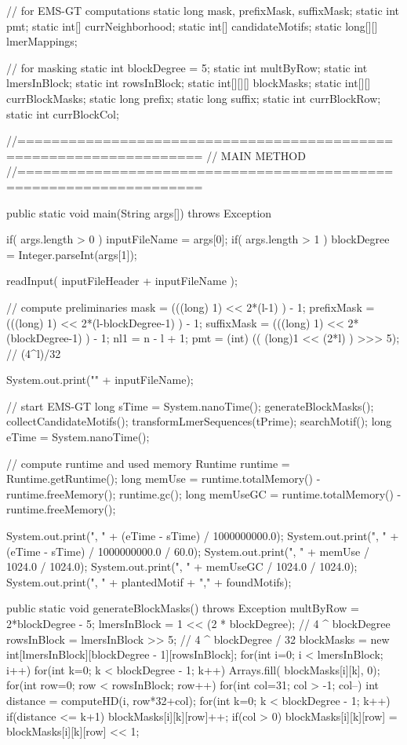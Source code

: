 \documentclass[oneside,12pt]{DISCSthesis}
\begin{document}
{\begin{footnotesize}
\begin{verbatimtab}[2]
{  // for EMS-GT computations
  static long mask, prefixMask, suffixMask;
  static int pmt;
  static int[] currNeighborhood;
  static int[] candidateMotifs;
  static long[][] lmerMappings;

  // for masking
  static int blockDegree = 5;
  static int multByRow;
  static int lmersInBlock;
  static int rowsInBlock;
  static int[][][] blockMasks;
  static int[][] currBlockMasks;
  static long prefix;
  static long suffix;
  static int currBlockRow;
  static int currBlockCol;
  
//===================================================================
// MAIN METHOD
//===================================================================

  public static void main(String args[]) throws Exception {
    if( args.length > 0 ) {
      inputFileName = args[0];
      if( args.length > 1 ) {
        blockDegree = Integer.parseInt(args[1]);
      }
    }

    readInput( inputFileHeader + inputFileName );

    // compute preliminaries
    mask = (((long) 1) << 2*(l-1) ) - 1;
    prefixMask = (((long) 1) << 2*(l-blockDegree-1) ) - 1;
    suffixMask = (((long) 1) << 2*(blockDegree-1) ) - 1;
    nl1 = n - l + 1;
    pmt = (int) (( (long)1 << (2*l) ) >>> 5); // (4^l)/32
    
    System.out.print("\n" + inputFileName);
    
    // start EMS-GT
    long sTime = System.nanoTime();
    generateBlockMasks();
    collectCandidateMotifs();
    transformLmerSequences(tPrime);
    searchMotif();    
    long eTime = System.nanoTime();

    // compute runtime and used memory
    Runtime runtime = Runtime.getRuntime();
    long memUse = runtime.totalMemory() - runtime.freeMemory();
    runtime.gc();
    long memUseGC = runtime.totalMemory() - runtime.freeMemory();

    System.out.print(", " + (eTime - sTime) / 1000000000.0);
    System.out.print(", " + (eTime - sTime) / 1000000000.0 / 60.0);
    System.out.print(", " + memUse / 1024.0 / 1024.0);
    System.out.print(", " + memUseGC / 1024.0 / 1024.0);
    System.out.print(", " + plantedMotif + "," + foundMotifs);
  }

  public static void generateBlockMasks() throws Exception {
    multByRow = 2*blockDegree - 5;
    lmersInBlock = 1 << (2 * blockDegree);    // 4 ^ blockDegree
    rowsInBlock = lmersInBlock >> 5;      // 4 ^ blockDegree / 32
    blockMasks = new int[lmersInBlock][blockDegree - 1][rowsInBlock];
    for(int i=0; i < lmersInBlock; i++) {
      for(int k=0; k < blockDegree - 1; k++) {
        Arrays.fill( blockMasks[i][k], 0);
      }
      for(int row=0; row < rowsInBlock; row++) {
        for(int col=31; col > -1; col--) {
          int distance = computeHD(i, row*32+col);
          for(int k=0; k < blockDegree - 1; k++) {
            if(distance <= k+1) {
              blockMasks[i][k][row]++;
            }
            if(col > 0) {
              blockMasks[i][k][row] = blockMasks[i][k][row] << 1;
            }
          }
        }
      }
    }
  }

}
\end{verbatimtab}
\end{footnotesize}}
\end{document}

